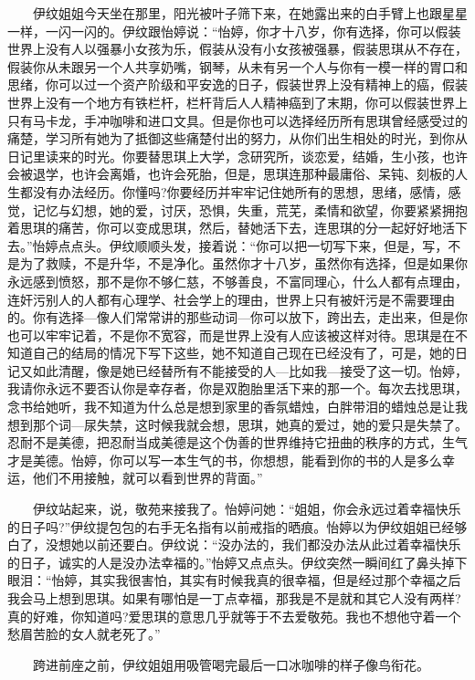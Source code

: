\documentclass[12pt,UTF8]{ctexbook}
\begin{document}
　　伊纹姐姐今天坐在那里，阳光被叶子筛下来，在她露出来的白手臂上也跟星星一样，一闪一闪的。伊纹跟怡婷说：\enquote{怡婷，你才十八岁，你有选择，你可以假装世界上没有人以强暴小女孩为乐，假装从没有小女孩被强暴，假装思琪从不存在，假装你从未跟另一个人共享奶嘴，钢琴，从未有另一个人与你有一模一样的胃口和思绪，你可以过一个资产阶级和平安逸的日子，假装世界上没有精神上的癌，假装世界上没有一个地方有铁栏杆，栏杆背后人人精神癌到了末期，你可以假装世界上只有马卡龙，手冲咖啡和进口文具。但是你也可以选择经历所有思琪曾经感受过的痛楚，学习所有她为了抵御这些痛楚付出的努力，从你们出生相处的时光，到你从日记里读来的时光。你要替思琪上大学，念研究所，谈恋爱，结婚，生小孩，也许会被退学，也许会离婚，也许会死胎，但是，思琪连那种最庸俗、呆钝、刻板的人生都没有办法经历。你懂吗?你要经历并牢牢记住她所有的思想，思绪，感情，感觉，记忆与幻想，她的爱，讨厌，恐惧，失重，荒芜，柔情和欲望，你要紧紧拥抱着思琪的痛苦，你可以变成思琪，然后，替她活下去，连思琪的分一起好好地活下去。}怡婷点点头。伊纹顺顺头发，接着说：\enquote{你可以把一切写下来，但是，写，不是为了救赎，不是升华，不是净化。虽然你才十八岁，虽然你有选择，但是如果你永远感到愤怒，那不是你不够仁慈，不够善良，不富同理心，什么人都有点理由，连奸污别人的人都有心理学、社会学上的理由，世界上只有被奸污是不需要理由的。你有选择---像人们常常讲的那些动词---你可以放下，跨出去，走出来，但是你也可以牢牢记着，不是你不宽容，而是世界上没有人应该被这样对待。思琪是在不知道自己的结局的情况下写下这些，她不知道自己现在已经没有了，可是，她的日记又如此清醒，像是她已经替所有不能接受的人---比如我---接受了这一切。怡婷，我请你永远不要否认你是幸存者，你是双胞胎里活下来的那一个。每次去找思琪，念书给她听，我不知道为什么总是想到家里的香氛蜡烛，白胖带泪的蜡烛总是让我想到那个词---尿失禁，这时候我就会想，思琪，她真的爱过，她的爱只是失禁了。忍耐不是美德，把忍耐当成美德是这个伪善的世界维持它扭曲的秩序的方式，生气才是美德。怡婷，你可以写一本生气的书，你想想，能看到你的书的人是多么幸运，他们不用接触，就可以看到世界的背面。}

　　伊纹站起来，说，敬苑来接我了。怡婷问她：\enquote{姐姐，你会永远过着幸福快乐的日子吗?}伊纹提包包的右手无名指有以前戒指的晒痕。怡婷以为伊纹姐姐已经够白了，没想她以前还要白。伊纹说：\enquote{没办法的，我们都没办法从此过着幸福快乐的日子，诚实的人是没办法幸福的。}怡婷又点点头。伊纹突然一瞬间红了鼻头掉下眼泪：\enquote{怡婷，其实我很害怕，其实有时候我真的很幸福，但是经过那个幸福之后我会马上想到思琪。如果有哪怕是一丁点幸福，那我是不是就和其它人没有两样?真的好难，你知道吗?爱思琪的意思几乎就等于不去爱敬苑。我也不想他守着一个愁眉苦脸的女人就老死了。}

　　跨进前座之前，伊纹姐姐用吸管喝完最后一口冰咖啡的样子像鸟衔花。
\end{document}
